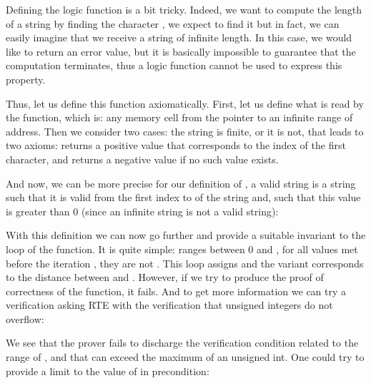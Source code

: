 Defining the logic function  is a bit tricky. Indeed,
we want to compute the length of a string by finding the character
, we expect to find it but in fact, we
can easily imagine that we receive a string of infinite length. In this case,
we would like to return an error value, but it is basically impossible to
guarantee that the computation terminates, thus a logic function cannot
be used to express this property.



Thus, let us define this function axiomatically. First, let us define what
is read by the function, which is: any memory cell from the pointer to an
infinite range of address. Then we consider two cases: the string is
finite, or it is not, that leads to two axioms:  returns
a positive value that corresponds to the index of the first
 character, and returns a negative value if
no such value exists.






And now, we can be more precise for our definition of
, a valid string is a
string such that it is valid from the first index to 
of the string and, such that this value is greater than 0 (since an
infinite string is not a valid string):








With this definition we can now go further and provide a suitable
invariant to the loop of the  function. It is quite
simple:  ranges between 0 and , for
all values met before the iteration , they are not
. This loop assigns  and
the variant corresponds to the distance between  and
. However, if we try to produce the proof of
correctness of the function, it fails. And to get more information
we can try a verification asking RTE with the verification that unsigned
integers do not overflow:






We see that the prover fails to discharge the verification condition
related to the range of , and that
 can exceed the maximum of an unsigned int. One could try
to provide a limit to the value of  in precondition:



